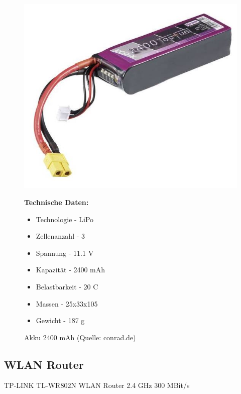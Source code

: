 \begin{figure}[htb]
	\centering
	\begin{minipage}{0.49\linewidth}
		\centering
		\includegraphics[scale=0.5]{images/akku.jpg}
		\caption{Akku 2400 mAh \newline (Quelle: conrad.de)}
	\end{minipage}
	\begin{minipage}{0.45\linewidth}
		\textbf{Technische Daten:} 
		\begin{itemize} 
			\item Technologie - LiPo 
		    \item Zellenanzahl - 3
			\item Spannung - 11.1 V
			\item Kapazität - 2400 mAh
			\item Belastbarkeit - 20 C
			\item Massen - 25x33x105
			\item Gewicht - 187 g
		\end{itemize}
	\end{minipage}
\end{figure}

\subsection{WLAN Router}

TP-LINK TL-WR802N WLAN Router 2.4 GHz 300 MBit/s

